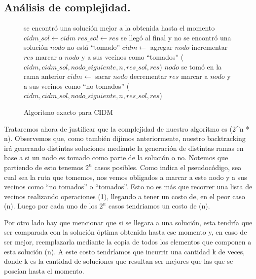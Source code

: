 \vspace*{0.6cm}


\subsection{Análisis de complejidad.}

\vspace*{0.3cm}

\begin{figure}
\begin{codebox}
\li \If se encontró una solución mejor a la obtenida hasta el momento
\li \Then 
 		$cidm\_sol \leftarrow cidm$
\li 		$res\_sol \leftarrow res$ 		
\li 		\Return
	\End
\li \If se llegó al final y no se encontró una solución
\li \Then \Return
	\End
\li \If $nodo$ no está ``tomado''	
\li \Then
		$cidm \leftarrow$ agregar $nodo$
\li 		incrementar $res$
\li 		marcar a $nodo$ y a sus vecinos como ``tomados''
($cidm,cidm\_sol,nodo\_siguiente,n,res\_sol,res$)
	\End
\li 	\If $nodo$ se tomó en la rama anterior
\li 	\Then
		$cidm \leftarrow$ sacar $nodo$
\li		decrementar $res$
\li 		marcar a $nodo$ y a sus vecinos como ``no tomados''
	\End
{}($cidm,cidm\_sol,nodo\_siguiente,n,res\_sol,res$)
\end{codebox}
\caption{Algoritmo exacto para CIDM}\label{code:exacto}
\end{figure}

Trataremos ahora de justificar que la complejidad de nuestro algoritmo es (2^n * n).
Observemos que, como también dijimos anteriormente, nuestro backtracking irá generando distintas soluciones mediante la generación de distintas ramas en base a si un nodo es tomado como parte de la solución o no. Notemos que partiendo de esto tenemos $2^n$ casos posibles. Como indica el pseudocódigo, sea cual sea la ruta que tomemos, nos vemos obligados a marcar a este nodo y a sus vecinos como ``no tomados'' o ``tomados''. Esto no es más que recorrer una lista de vecinos realizando operaciones (1), llegando a tener un costo de, en el peor caso (n). Luego por cada uno de los $2^n$ casos tendriamos un costo de (n).

Por otro lado hay que mencionar que si se llegara a una solución, esta tendría que ser comparada con la solución óptima obtenida hasta ese momento y, en caso de ser mejor, reemplazarla mediante la copia de todos los elementos que componen a esta solución (n). A este costo tendríamos que incurrir una cantidad k de veces, donde k es la cantidad de soluciones que resultan ser mejores que las que se poseían hasta el momento.

